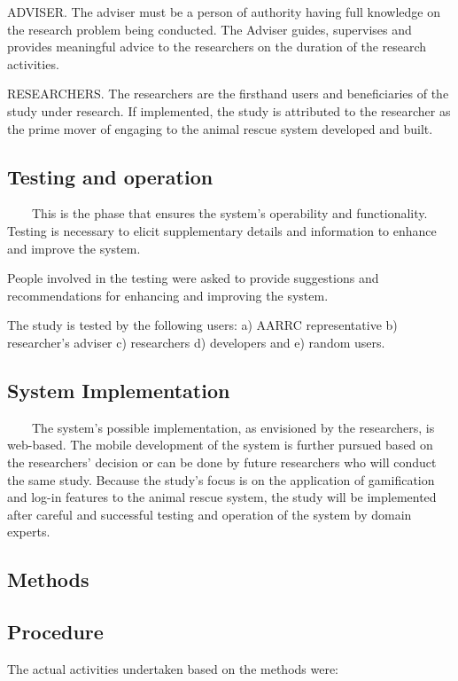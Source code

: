 ADVISER. The adviser must be a person of authority having full knowledge on the research problem being conducted. The Adviser guides, supervises and provides meaningful advice to the researchers on the duration of the research activities.

RESEARCHERS. The researchers are the firsthand users and beneficiaries of the study under research. If implemented, the study is attributed to the researcher as the prime mover of engaging to the animal rescue system developed and built. 

\subsection{Testing and operation}

~~~~This is the phase that ensures the system's operability and functionality. Testing is necessary to elicit supplementary details and information to enhance and improve the system. 

People involved in the testing were asked to provide suggestions and recommendations for enhancing and improving the system.

The study is tested by the following users: a) AARRC representative b) researcher’s adviser c) researchers d) developers and e) random users.

\subsection{System Implementation}

~~~~The system's possible implementation, as envisioned by the researchers, is web-based. The mobile development of the system is further pursued based on the researchers' decision or can be done by future researchers who will conduct the same study. Because the study's focus is on the application of gamification and log-in features to the animal rescue system, the study will be implemented after careful and successful testing and operation of the system by domain experts.

\subsection{Methods}

\subsection{Procedure}

The actual activities undertaken based on the methods were:


